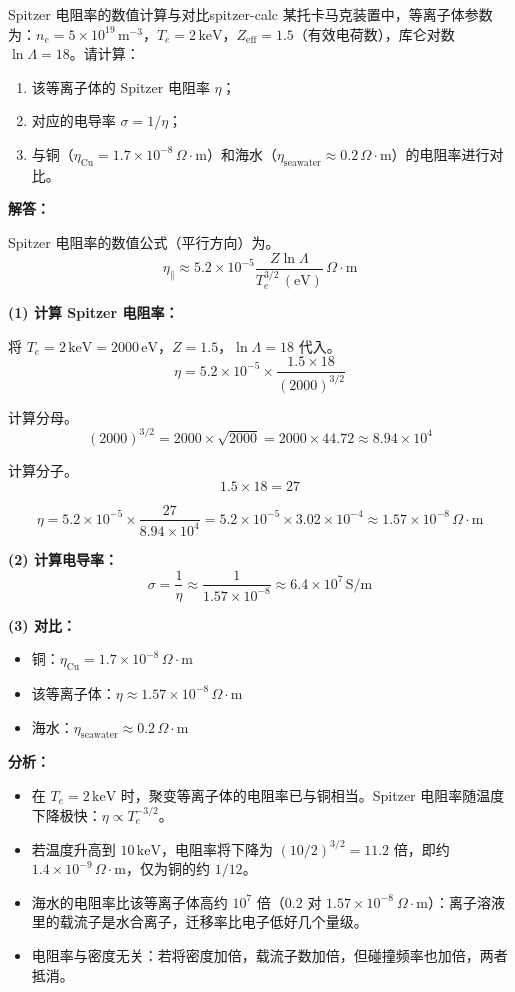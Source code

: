 \begin{example}{Spitzer 电阻率的数值计算与对比}{spitzer-calc}
某托卡马克装置中，等离子体参数为：$n_e = 5\times 10^{19}\,\mathrm{m}^{-3}$，$T_e = 2\,\mathrm{keV}$，$Z_{\text{eff}} = 1.5$（有效电荷数），库仑对数 $\ln\Lambda = 18$。请计算：
\begin{enumerate}[label=(\arabic*)]
\item 该等离子体的 Spitzer 电阻率 $\eta$；
\item 对应的电导率 $\sigma = 1/\eta$；
\item 与铜（$\eta_{\text{Cu}} = 1.7\times 10^{-8}\,\Omega\cdot\mathrm{m}$）和海水（$\eta_{\text{seawater}} \approx 0.2\,\Omega\cdot\mathrm{m}$）的电阻率进行对比。
\end{enumerate}
\tcblower
\textbf{解答：}

Spitzer 电阻率的数值公式（平行方向）为。
\[
\eta_{\parallel} \approx 5.2\times 10^{-5}\frac{Z\ln\Lambda}{T_e^{3/2}\,\mathrm{(eV)}}\,\Omega\cdot\mathrm{m}
\]

\textbf{(1) 计算 Spitzer 电阻率：}

将 $T_e = 2\,\mathrm{keV} = 2000\,\mathrm{eV}$，$Z = 1.5$，$\ln\Lambda = 18$ 代入。
\[
\eta = 5.2\times 10^{-5}\times\frac{1.5\times 18}{(2000)^{3/2}}
\]

计算分母。
\[
(2000)^{3/2} = 2000\times\sqrt{2000} = 2000\times 44.72 \approx 8.94\times 10^4
\]

计算分子。
\[
1.5\times 18 = 27
\]

\[
\eta = 5.2\times 10^{-5}\times\frac{27}{8.94\times 10^4}
= 5.2\times 10^{-5}\times 3.02\times 10^{-4}
\approx 1.57\times 10^{-8}\,\Omega\cdot\mathrm{m}
\]

\textbf{(2) 计算电导率：}
\[
\sigma = \frac{1}{\eta} \approx \frac{1}{1.57\times 10^{-8}} \approx 6.4\times 10^{7}\,\mathrm{S/m}
\]

\textbf{(3) 对比：}
\begin{itemize}[leftmargin=*,itemsep=0pt]
\item 铜：$\eta_{\text{Cu}} = 1.7\times 10^{-8}\,\Omega\cdot\mathrm{m}$
\item 该等离子体：$\eta \approx 1.57\times 10^{-8}\,\Omega\cdot\mathrm{m}$
\item 海水：$\eta_{\text{seawater}} \approx 0.2\,\Omega\cdot\mathrm{m}$
\end{itemize}

\textbf{分析：}
\begin{itemize}[leftmargin=*,itemsep=0pt]
\item 在 $T_e = 2\,\mathrm{keV}$ 时，聚变等离子体的电阻率已与铜相当。Spitzer 电阻率随温度下降极快：$\eta \propto T_e^{-3/2}$。
\item 若温度升高到 $10\,\mathrm{keV}$，电阻率将下降为 $(10/2)^{3/2} = 11.2$ 倍，即约 $1.4\times 10^{-9}\,\Omega\cdot\mathrm{m}$，仅为铜的约 $1/12$。
\item 海水的电阻率比该等离子体高约 $10^{7}$ 倍（$0.2$ 对 $1.57\times10^{-8}\ \Omega\cdot\mathrm{m}$）：离子溶液里的载流子是水合离子，迁移率比电子低好几个量级。
\item 电阻率与密度无关：若将密度加倍，载流子数加倍，但碰撞频率也加倍，两者抵消。
\end{itemize}
\end{example}


